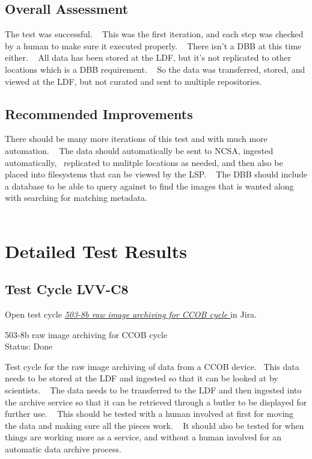 \documentclass[DM,lsstdraft,STR,toc]{lsstdoc}
\begin{document}
\subsection{Overall Assessment}
\label{sect:overallassessment}

The test was successful. ~ This was the first iteration, and each step
was checked by a human to make sure it executed properly. ~ There isn't
a DBB at this time either. ~ All data has been stored at the LDF, but
it's not replicated to other locations which is a DBB requirement. ~ So
the data was transferred, stored, and viewed at the LDF, but not curated
and sent to multiple repositories.~~


\subsection{Recommended Improvements}
\label{sect:recommendations}

There should be many more iterations of this test and with much more
automation. ~ The data should automatically be sent to NCSA, ingested
automatically, ~replicated to mulitple locations as needed, and then
also be placed into filesystems that can be viewed by the LSP. ~ The DBB
should include a database to be able to query against to find the images
that is wanted along with searching for matching metadata. ~\\
\hspace*{0.333em} ~


\newpage
\section{Detailed Test Results}
\label{sect:detailedtestresults}


  \subsection{Test Cycle LVV-C8 }

Open test cycle {\it \href{https://jira.lsstcorp.org/secure/Tests.jspa#/testrun/LVV-C8}{503-8b raw image archiving for CCOB cycle
}} in Jira.

  503-8b raw image archiving for CCOB cycle
\\
  Status: Done

  Test cycle for the raw image archiving of data from a CCOB device. ~This
data needs to be stored at the LDF and ingested so that it can be looked
at by scientists. ~ The data needs to be transferred to the LDF and then
ingested into the archive service so that it can be retrieved through a
butler to be displayed for further use. ~ This should be tested with a
human involved at first for moving the data and making sure all the
pieces work. ~ It should also be tested for when things are working more
as a service, and without a human involved for an automatic data archive
process.\\
~\\
\end{document}
